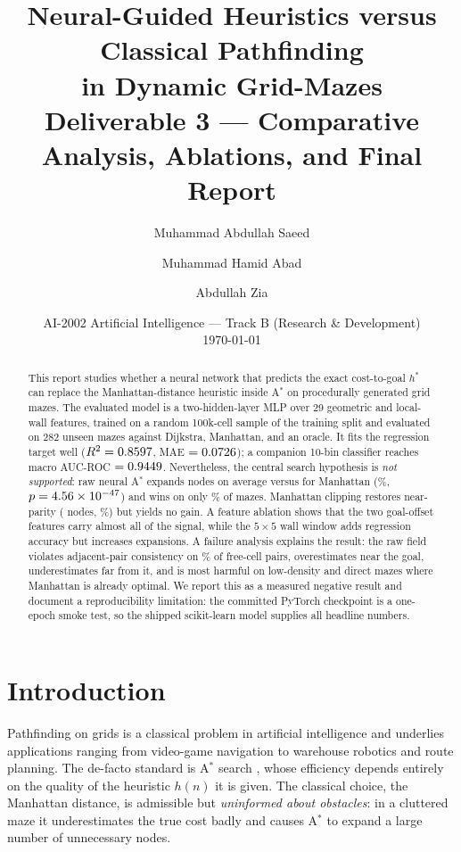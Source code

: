 \documentclass[11pt]{article}
\title{\textbf{Neural-Guided Heuristics versus Classical Pathfinding\\ in Dynamic Grid-Mazes}\\[4pt]
\large Deliverable 3 --- Comparative Analysis, Ablations, and Final Report}
\author{
  Muhammad Abdullah Saeed \and
  Muhammad Hamid Abad \and
  Abdullah Zia
}
\date{AI-2002 Artificial Intelligence --- Track B (Research \& Development)\\ \today}
\begin{document}
\maketitle

\begin{abstract}
\noindent
This report studies whether a neural network that predicts the exact cost-to-goal
$h^\ast$ can replace the Manhattan-distance heuristic inside A$^\ast$ on procedurally
generated grid mazes. The evaluated model is a two-hidden-layer MLP over 29 geometric
and local-wall features, trained on a random 100k-cell sample of the training split
and evaluated on 282 unseen mazes against Dijkstra, Manhattan, and an oracle. It fits the
regression target well ($R^2=0.8597$, MAE $=0.0726$); a companion 10-bin
classifier reaches macro AUC-ROC $=0.9449$. Nevertheless, the
central search hypothesis is \emph{not supported}: raw neural A$^\ast$ expands
\PfiveRawNodes{} nodes on average versus \PfiveManhattanNodes{} for Manhattan
(\PfiveRawRelative{}\%, $p=4.56\times10^{-47}$) and wins on only \PfiveRawWins{}\% of mazes.
Manhattan clipping restores near-parity (\PfiveClipNodes{} nodes, \PfiveClipRelative{}\%)
but yields no gain. A feature ablation shows that the two goal-offset features carry
almost all of the signal, while the $5\times5$ wall window adds regression accuracy but
increases expansions. A failure analysis explains the result: the raw field violates
adjacent-pair consistency on \PfiveConsistencyRaw{}\% of free-cell pairs, overestimates
near the goal, underestimates far from it, and is most harmful on low-density and
direct mazes where Manhattan is already optimal. We report this as a measured negative
result and document a reproducibility limitation: the committed PyTorch checkpoint is a
one-epoch smoke test, so the shipped scikit-learn model supplies all headline numbers.
\end{abstract}

\section{Introduction}
Pathfinding on grids is a classical problem in artificial intelligence and underlies
applications ranging from video-game navigation to warehouse robotics and route
planning. The de-facto standard is A$^\ast$ search \cite{hart1968}, whose efficiency
depends entirely on the quality of the heuristic $h(n)$ it is given. The classical
choice, the Manhattan distance, is admissible but \emph{uninformed about obstacles}:
in a cluttered maze it underestimates the true cost badly and causes A$^\ast$ to expand
a large number of unnecessary nodes.
\end{document}
